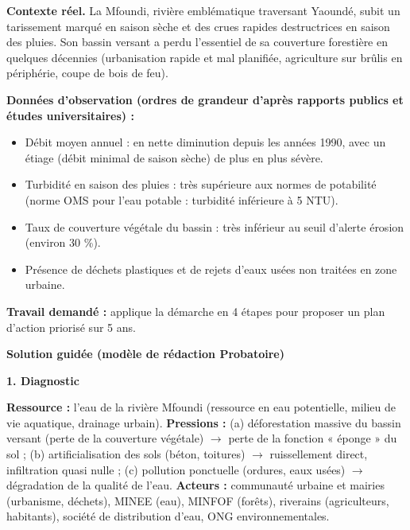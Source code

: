 \documentclass[11pt]{article}
\begin{document}
\begin{experience}
\textbf{Contexte réel.} La Mfoundi, rivière emblématique traversant Yaoundé, subit un tarissement marqué en saison sèche et des crues rapides destructrices en saison des pluies. Son bassin versant a perdu l'essentiel de sa couverture forestière en quelques décennies (urbanisation rapide et mal planifiée, agriculture sur brûlis en périphérie, coupe de bois de feu).

\textbf{Données d'observation (ordres de grandeur d'après rapports publics et études universitaires) :}
\begin{itemize}
    \item Débit moyen annuel : en nette diminution depuis les années 1990, avec un étiage (débit minimal de saison sèche) de plus en plus sévère.
    \item Turbidité en saison des pluies : très supérieure aux normes de potabilité (norme OMS pour l'eau potable : turbidité inférieure à 5 NTU).
    \item Taux de couverture végétale du bassin : très inférieur au seuil d'alerte érosion (environ 30 \%).
    \item Présence de déchets plastiques et de rejets d'eaux usées non traitées en zone urbaine.
\end{itemize}

\textbf{Travail demandé :} applique la démarche en 4 étapes pour proposer un plan d'action priorisé sur 5 ans.

\medskip
\textbf{Solution guidée (modèle de rédaction Probatoire)}

\textbf{1. Diagnostic}\par
\textbf{Ressource :} l'eau de la rivière Mfoundi (ressource en eau potentielle, milieu de vie aquatique, drainage urbain).
\textbf{Pressions :} (a) déforestation massive du bassin versant (perte de la couverture végétale) $\rightarrow$ perte de la fonction « éponge » du sol ; (b) artificialisation des sols (béton, toitures) $\rightarrow$ ruissellement direct, infiltration quasi nulle ; (c) pollution ponctuelle (ordures, eaux usées) $\rightarrow$ dégradation de la qualité de l'eau.
\textbf{Acteurs :} communauté urbaine et mairies (urbanisme, déchets), MINEE (eau), MINFOF (forêts), riverains (agriculteurs, habitants), société de distribution d'eau, ONG environnementales.


\end{experience}
\end{document}
